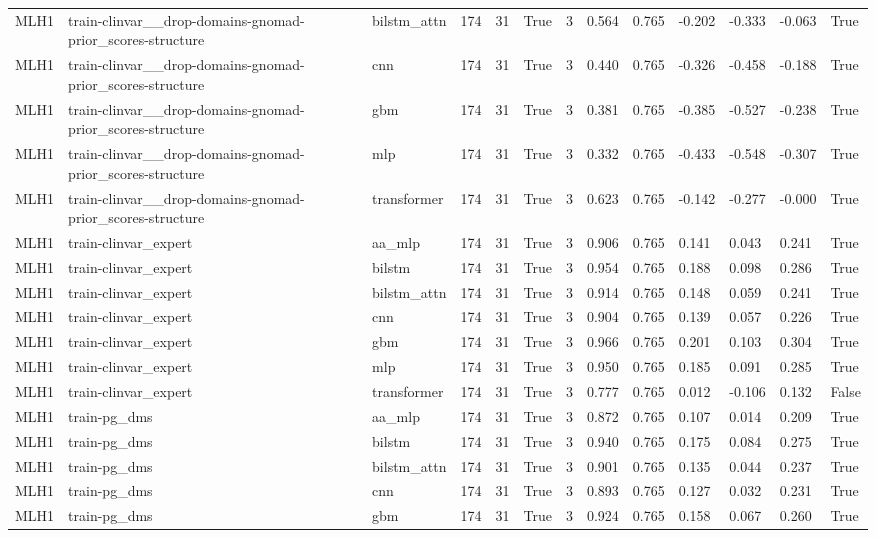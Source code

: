 \begin{table}[t]
\begin{tabular}{lllllllllllll}
MLH1 & train-clinvar\_\_drop-domains-gnomad-prior\_scores-structure & bilstm\_attn & 174 & 31 & True & 3 & 0.564 & 0.765 & -0.202 & -0.333 & -0.063 & True \\
MLH1 & train-clinvar\_\_drop-domains-gnomad-prior\_scores-structure & cnn & 174 & 31 & True & 3 & 0.440 & 0.765 & -0.326 & -0.458 & -0.188 & True \\
MLH1 & train-clinvar\_\_drop-domains-gnomad-prior\_scores-structure & gbm & 174 & 31 & True & 3 & 0.381 & 0.765 & -0.385 & -0.527 & -0.238 & True \\
MLH1 & train-clinvar\_\_drop-domains-gnomad-prior\_scores-structure & mlp & 174 & 31 & True & 3 & 0.332 & 0.765 & -0.433 & -0.548 & -0.307 & True \\
MLH1 & train-clinvar\_\_drop-domains-gnomad-prior\_scores-structure & transformer & 174 & 31 & True & 3 & 0.623 & 0.765 & -0.142 & -0.277 & -0.000 & True \\
MLH1 & train-clinvar\_expert & aa\_mlp & 174 & 31 & True & 3 & 0.906 & 0.765 & 0.141 & 0.043 & 0.241 & True \\
MLH1 & train-clinvar\_expert & bilstm & 174 & 31 & True & 3 & 0.954 & 0.765 & 0.188 & 0.098 & 0.286 & True \\
MLH1 & train-clinvar\_expert & bilstm\_attn & 174 & 31 & True & 3 & 0.914 & 0.765 & 0.148 & 0.059 & 0.241 & True \\
MLH1 & train-clinvar\_expert & cnn & 174 & 31 & True & 3 & 0.904 & 0.765 & 0.139 & 0.057 & 0.226 & True \\
MLH1 & train-clinvar\_expert & gbm & 174 & 31 & True & 3 & 0.966 & 0.765 & 0.201 & 0.103 & 0.304 & True \\
MLH1 & train-clinvar\_expert & mlp & 174 & 31 & True & 3 & 0.950 & 0.765 & 0.185 & 0.091 & 0.285 & True \\
MLH1 & train-clinvar\_expert & transformer & 174 & 31 & True & 3 & 0.777 & 0.765 & 0.012 & -0.106 & 0.132 & False \\
MLH1 & train-pg\_dms & aa\_mlp & 174 & 31 & True & 3 & 0.872 & 0.765 & 0.107 & 0.014 & 0.209 & True \\
MLH1 & train-pg\_dms & bilstm & 174 & 31 & True & 3 & 0.940 & 0.765 & 0.175 & 0.084 & 0.275 & True \\
MLH1 & train-pg\_dms & bilstm\_attn & 174 & 31 & True & 3 & 0.901 & 0.765 & 0.135 & 0.044 & 0.237 & True \\
MLH1 & train-pg\_dms & cnn & 174 & 31 & True & 3 & 0.893 & 0.765 & 0.127 & 0.032 & 0.231 & True \\
MLH1 & train-pg\_dms & gbm & 174 & 31 & True & 3 & 0.924 & 0.765 & 0.158 & 0.067 & 0.260 & True \\

\end{tabular}
\end{table}
